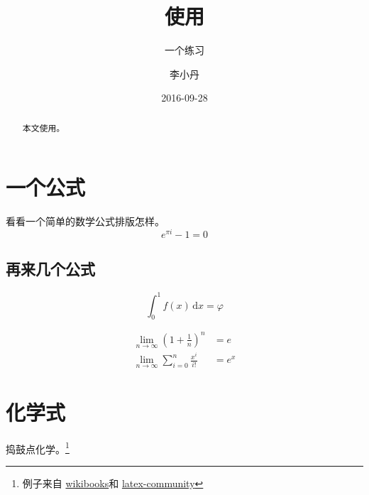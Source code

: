 \documentclass{scrartcl}
\begin{document}
\begin{CJK}{UTF8}{gbsn}

\chead{\headmark}
\cfoot[]{}

\title{使用}
\subtitle{一个练习}
\author{李小丹}
\date{2016-09-28}

\begin{titlepage}

\maketitle

\begin{abstract}
	本文使用。
\end{abstract}

\vspace{1cm}

{\small{\tableofcontents}}

\end{titlepage}



\section{一个公式}
看看一个简单的数学公式排版怎样。\\

\begin{equation}
	e^{\pi i} - 1 = 0
\end{equation}

\subsection{再来几个公式}
\begin{equation}
	\int_0^1 f(x)\,\mathrm{d}x = \varphi
\end{equation}

\begin{align}
	\lim_{n \to \infty} \left(1 + \frac{1}{n} \right) ^ n & = e\\
	\lim_{n \to \infty} \sum_{i=0}^{n} \frac{x^i}{i!} & = e^x
\end{align}

\section{化学式}
捣鼓点化学。\footnote{
	例子来自
	\href{https://en.wikibooks.org/wiki/LaTeX/Chemical\_Graphics}
	{wikibooks}和
	\href{http://latex-community.org/know-how/434-chemistry-molecules}
	{latex-community}} \\


\end{CJK}
\end{document}

